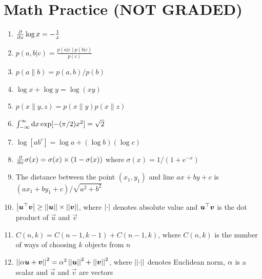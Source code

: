 \documentclass[fleqn]{article}
\begin{document}

\section{ Math Practice (NOT GRADED)}
\begin{enumerate}
\setlength{\itemsep}{1.2\baselineskip}
\item $\frac \partial {\partial x} \log x = - \frac 1 x$
\item $p(a, b | c) = \frac{p(a | c)p(b | c)}{p(c)}$
\item $p(a \| b) = p(a,b) / p(b)$
\item $\log x + \log y = \log (xy)$
\item $p(x \| y,z) = p(x \| y) p(x \| z)$
\item $\int_{-\infty}^{\infty} \textrm{d} x \exp[-(\pi/2) x^2] = \sqrt{2}$
\item $\log [ab^c] = \log a + (\log b) (\log c)$
\item $\frac \partial {\partial x} \sigma(x) = \sigma(x)\times(1-\sigma(x))$ where $\sigma(x) = 1/(1+e^{-x})$
\item The distance between the point $(x_1,y_1)$ and line $ax + by + c$ is ${(ax_1 + by_1+c)}/{\sqrt{a^2 + b^2}}$

\item $\left\vert \boldsymbol{u}{}^\top\boldsymbol{v} \right\vert \geq \left\vert\left\vert \boldsymbol{u} \right\vert\right\vert \times \left\vert\left\vert \boldsymbol{v} \right\vert\right\vert$, where $\left\vert \cdot \right\vert$ denotes absolute value and $\boldsymbol{u}{}^\top\boldsymbol{v}$ is the dot product of $\vec u$ and $\vec v$
\item $C(n,k) = C(n-1, k-1) + C(n-1, k)$, where $C(n,k)$ is the number of ways of choosing $k$ objects from $n$
\item $\left\vert\left\vert \alpha \boldsymbol{u} + \boldsymbol{v} \right\vert\right\vert^2 = \alpha^2 \left\vert\left\vert \boldsymbol{u} \right\vert\right\vert^2 + \left\vert\left\vert \boldsymbol{v} \right\vert\right\vert^2$, where $\left\vert\left\vert \cdot \right\vert\right\vert$ denotes Euclidean norm, $\alpha$ is a scalar and $\vec u$ and $\vec v$ are vectors

\end{enumerate}
\end{document}
